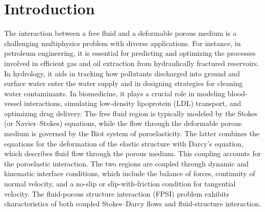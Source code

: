 \documentclass[11pt]{article}
\numberwithin{equation}{section}
\newcommand{\0}{{\mathbf{0}}}
\numberwithin{equation}{section}
\begin{document}
\section{Introduction}

The interaction between a free fluid and a deformable porous medium is a challenging multiphysics problem with diverse applications. 
For instance, in petroleum engineering, it is essential for predicting and optimizing the processes involved in efficient gas and oil extraction from hydraulically fractured reservoirs. 
In hydrology, it aids in tracking how pollutants discharged into ground and surface water enter the water supply and in designing strategies for cleaning water contaminants. 
In biomedicine, it plays a crucial role in modeling blood-vessel interactions, simulating low-density lipoprotein (LDL) transport, and optimizing drug delivery.
The free fluid region is typically modeled by the Stokes (or Navier--Stokes) equations, while the flow through the deformable porous medium is governed by the Biot system of poroelasticity. 
The latter combines the equations for the deformation of the elastic structure with Darcy's equation, which describes fluid flow through the porous medium. 
This coupling accounts for the poroelastic interaction.
The two regions are coupled through dynamic and kinematic interface conditions, which include the balance of forces, continuity of normal velocity, and a no-slip or slip-with-friction condition for tangential velocity. 
The fluid-porous structure interaction (FPSI) problem exhibits characteristics of both coupled Stokes--Darcy flows and fluid-structure interaction.
\end{document}
